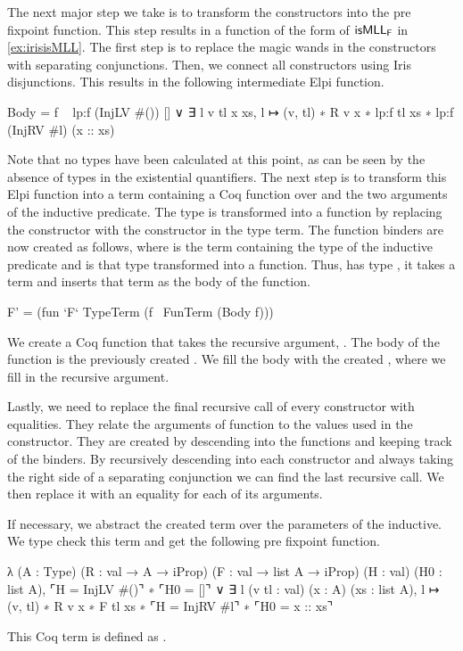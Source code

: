 \documentclass[thesis.tex]{subfiles}
\begin{document}
The next major step we take is to transform the constructors into the pre fixpoint function.  This step results in a function of the form of $\textsf{\upshape isMLL}_{\textsf{\upshape F}}$ in \cref{ex:irisisMLL}.
The first step is to replace the magic wands in the constructors with separating conjunctions. Then, we connect all constructors using Iris disjunctions. This results in the following intermediate Elpi function.
\begin{elpicode}
  Body = f \ {{
      lp:f (InjLV #()) []
    ∨ ∃ l v tl x xs, 
        l ↦ (v, tl) ∗ R v x ∗ lp:f tl xs ∗ 
        lp:f (InjRV #l) (x :: xs)
  }}
\end{elpicode}
Note that no types have been calculated at this point, as can be seen by the absence of types in the existential quantifiers.
The next step is to transform this Elpi function into a term containing a Coq function over  and the two arguments of the inductive predicate. The type is transformed into a function by replacing the  constructor with the  constructor in the type term. The function binders are now created as follows, where  is the term containing the type of the inductive predicate and  is that type transformed into a function. Thus,  has type , it takes a term and inserts that term as the body of the function.
\begin{elpicode}
  F' = (fun `F` TypeTerm (f \ FunTerm (Body f)))
\end{elpicode}
We create a Coq function that takes the recursive argument, . The body of the function is the previously created . We fill the body with the created , where we fill in the recursive argument.

Lastly, we need to replace the final recursive call of every constructor with equalities. They relate the arguments of function to the values used in the constructor. They are created by descending into the functions and keeping track of the binders. By recursively descending into each constructor and always taking the right side of a separating conjunction we can find the last recursive call. We then replace it with an equality for each of its arguments.

If necessary, we abstract the created term over the parameters of the inductive. We type check this term and get the following pre fixpoint function.
\begin{coqcode}
  λ (A : Type) (R : val → A → iProp) 
    (F : val → list A → iProp) (H : val) (H0 : list A),
      ⌜H = InjLV #()⌝ ∗ ⌜H0 = []⌝
    ∨ ∃ l (v tl : val) (x : A) (xs : list A), 
        l ↦ (v, tl) ∗ R v x ∗ F tl xs ∗ 
        ⌜H = InjRV #l⌝ ∗ ⌜H0 = x :: xs⌝
\end{coqcode}
This Coq term is defined as .
\end{document}
